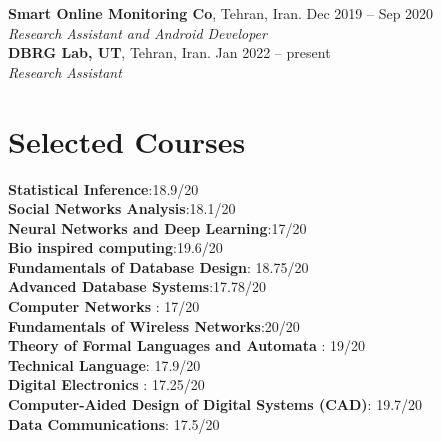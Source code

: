 \documentclass[margin,line]{res}
\begin{document}
\begin{resume}
{\bf Smart Online Monitoring Co}, Tehran, Iran. \hfill{Dec 2019 -- Sep 2020}\\
{\em Research Assistant and Android Developer  }\\

{\bf DBRG Lab, UT}, Tehran, Iran. \hfill{Jan 2022 -- present}\\
{\em Research Assistant  }\\

\section{\sc Selected Courses}
{\bf Statistical Inference}:18.9/20\\
{\bf Social Networks Analysis}:18.1/20\\
{\bf Neural Networks and Deep Learning}:17/20\\
{\bf Bio inspired computing}:19.6/20\\
{\bf Fundamentals of Database Design}: 18.75/20\\
{\bf Advanced Database Systems}:17.78/20\\
{\bf Computer Networks} :‌ 17/20\\
{\bf Fundamentals of Wireless Networks}:20/20\\
{\bf Theory of Formal Languages and Automata} :‌ 19/20\\
{\bf Technical Language}: 17.9/20\\
{\bf Digital Electronics} :‌ 17.25/20\\
{\bf Computer-Aided Design of Digital Systems (CAD)}: 19.7/20\\
{\bf Data Communications}: 17.5/20\\

\end{resume}
\end{document}
